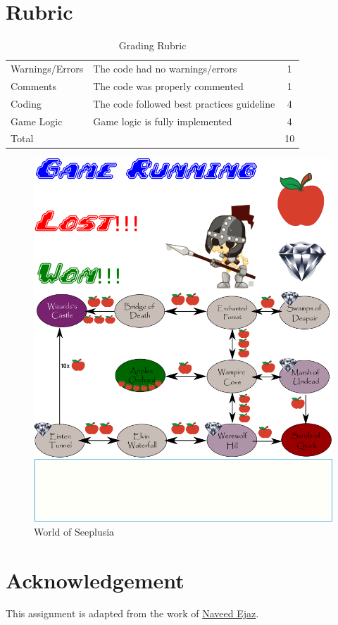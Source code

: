 \documentclass[a4paper,12pt]{article}
\begin{document}
	\section{Rubric}
	\begin{table}[h]
	    \centering
	    \begin{tabular}{llc}
	    \toprule
            Warnings/Errors	& The code had no warnings/errors	& 1 \\
            Comments &	The code was properly commented	& 1 \\
            Coding	& The code followed best practices guideline &	4 \\
            Game Logic	& Game logic is fully implemented	& 4 \\
            \midrule
            Total & & 10\\
            \bottomrule
	    \end{tabular}
	    \caption{Grading Rubric}
	    \label{Grading}
	\end{table}

		
\begin{figure}
	\centering
	\includegraphics[trim={0 0 0 9cm},clip, width=1\linewidth]{Seeplusia/assests}
	\caption{World of Seeplusia}
	\label{fig:assests}
\end{figure}

\section{Acknowledgement}
This assignment is adapted from the work of  \href{https://twitter.com/nav_ejaz}{Naveed Ejaz}.	
	
	
\end{document}
